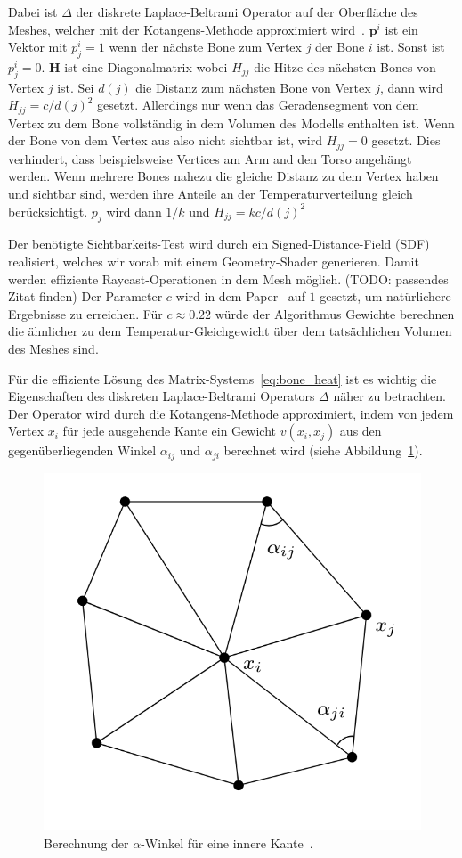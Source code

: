 Dabei ist $\Delta$ der diskrete Laplace-Beltrami Operator auf der Oberfläche des Meshes, welcher mit der Kotangens-Methode approximiert wird~\cite{laplace_beltrami_paper}. $\mathbf{p}^i$ ist ein Vektor mit $p^i_j=1$ wenn der nächste Bone zum Vertex $j$ der Bone $i$ ist. Sonst ist $p^i_j=0$. $\mathbf{H}$ ist eine Diagonalmatrix wobei $H_{jj}$ die Hitze des nächsten Bones von Vertex $j$ ist. Sei $d(j)$ die Distanz zum nächsten Bone von Vertex $j$, dann wird $H_{jj}=c/d(j)^2$ gesetzt. Allerdings nur wenn das Geradensegment von dem Vertex zu dem Bone vollständig in dem Volumen des Modells enthalten ist. Wenn der Bone von dem Vertex aus also nicht sichtbar ist, wird $H_{jj}=0$ gesetzt. Dies verhindert, dass beispielsweise Vertices am Arm and den Torso angehängt werden. Wenn mehrere Bones nahezu die gleiche Distanz zu dem Vertex haben und sichtbar sind, werden ihre Anteile an der Temperaturverteilung gleich berücksichtigt. $p_j$ wird dann $1/k$ und $H_{jj} = kc/d(j)^2$

Der benötigte Sichtbarkeits-Test wird durch ein Signed-Distance-Field (SDF) realisiert, welches wir vorab mit einem Geometry-Shader generieren. Damit werden effiziente Raycast-Operationen in dem Mesh möglich. (TODO: passendes Zitat finden)
Der Parameter $c$ wird in dem Paper~\cite{bone_heat_paper} auf $1$ gesetzt, um natürlichere Ergebnisse zu erreichen. Für $c\approx0.22$ würde der Algorithmus Gewichte berechnen die ähnlicher zu dem Temperatur-Gleichgewicht über dem tatsächlichen Volumen des Meshes sind.

Für die effiziente Lösung des Matrix-Systems~\ref{eq:bone_heat} ist es wichtig die Eigenschaften des diskreten Laplace-Beltrami Operators $\Delta$ näher zu betrachten. Der Operator wird durch die Kotangens-Methode approximiert, indem von jedem Vertex $x_i$ für jede ausgehende Kante ein Gewicht $v(x_i,x_j)$ aus den gegenüberliegenden Winkel $\alpha_{ij}$ und $\alpha_{ji}$ berechnet wird (siehe Abbildung~\ref{fig:cotangent_approx}).

\begin{figure}[h!]
	\centering
	\includegraphics[width=0.4\linewidth]{resources/img/cotangent_approx.png}
	\caption{Berechnung der $\alpha$-Winkel für eine innere Kante~\cite{laplace_beltrami_paper}.}
	\label{fig:cotangent_approx}
\end{figure}

